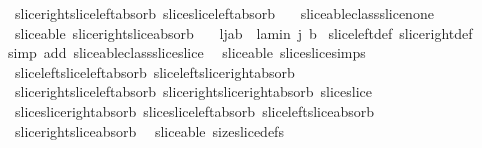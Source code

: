 \begin{isabellebody}
\ \ slice{\isacharunderscore}right{\isacharunderscore}slice{\isacharunderscore}left{\isacharunderscore}absorb\ slice{\isacharunderscore}slice{\isacharunderscore}left{\isacharunderscore}absorb\ \isanewline
\ \ sliceable{\isacharunderscore}class{\isachardot}slice{\isacharunderscore}none{\isacharparenright}%
\endisatagproof
{\isafoldproof}%
%
\isadelimproof
\isanewline
%
\endisadelimproof
\isanewline
{}\isamarkupfalse%
\ {\isacharparenleft}\ sliceable{\isacharparenright}\ slice{\isacharunderscore}right{\isacharunderscore}slice{\isacharunderscore}absorb{\isacharcolon}\ \isanewline
\ \ {\isachardoublequoteopen}{\isacharparenleft}l{\isasymdagger}{\isachardot}{\isachardot}j{\isacharparenright}{\isasymdagger}a{\isachardot}{\isachardot}b\ {\isacharequal}\ l{\isasymdagger}a{\isachardot}{\isachardot}{\isacharparenleft}min\ j\ b{\isacharparenright}{\isachardoublequoteclose}\isanewline
%
\isadelimproof
%
\endisadelimproof
%
\isatagproof
{}\isamarkupfalse%
\ slice{\isacharunderscore}left{\isacharunderscore}def\ slice{\isacharunderscore}right{\isacharunderscore}def\isanewline
{}\isamarkupfalse%
\ {\isacharparenleft}simp\ add{\isacharcolon}\ sliceable{\isacharunderscore}class{\isachardot}slice{\isacharunderscore}slice{\isacharparenright}%
\endisatagproof
{\isafoldproof}%
%
\isadelimproof
\isanewline
%
\endisadelimproof
\isanewline
\isanewline
{}\isamarkupfalse%
\ {\isacharparenleft}\ sliceable{\isacharparenright}\ slice{\isacharunderscore}slice{\isacharunderscore}simps\ {\isacharequal}\ \isanewline
\ \ slice{\isacharunderscore}left{\isacharunderscore}slice{\isacharunderscore}left{\isacharunderscore}absorb\ slice{\isacharunderscore}left{\isacharunderscore}slice{\isacharunderscore}right{\isacharunderscore}absorb\isanewline
\ \ slice{\isacharunderscore}right{\isacharunderscore}slice{\isacharunderscore}left{\isacharunderscore}absorb\ slice{\isacharunderscore}right{\isacharunderscore}slice{\isacharunderscore}right{\isacharunderscore}absorb\ slice{\isacharunderscore}slice\isanewline
\ \ slice{\isacharunderscore}slice{\isacharunderscore}right{\isacharunderscore}absorb\ slice{\isacharunderscore}slice{\isacharunderscore}left{\isacharunderscore}absorb\ slice{\isacharunderscore}left{\isacharunderscore}slice{\isacharunderscore}absorb\ \isanewline
\ \ slice{\isacharunderscore}right{\isacharunderscore}slice{\isacharunderscore}absorb\isanewline
\isanewline
{}\isamarkupfalse%
\ {\isacharparenleft}\ sliceable{\isacharparenright}\ size{\isacharunderscore}slice{\isacharunderscore}defs\ {\isacharequal}\ \isanewline

\end{isabellebody}
